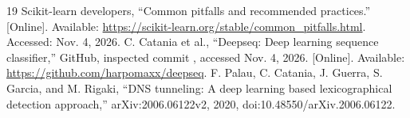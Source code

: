 \begin{thebibliography}{19}
 Scikit-learn developers, ``Common pitfalls and recommended practices.'' [Online]. Available: \url{https://scikit-learn.org/stable/common_pitfalls.html}. Accessed: Nov. 4, 2026.
 C. Catania et al., ``Deepseq: Deep learning sequence classifier,'' GitHub, inspected commit , accessed Nov. 4, 2026. [Online]. Available: \url{https://github.com/harpomaxx/deepseq}.
 F. Palau, C. Catania, J. Guerra, S. Garcia, and M. Rigaki, ``DNS tunneling: A deep learning based lexicographical detection approach,'' arXiv:2006.06122v2, 2020, doi:10.48550/arXiv.2006.06122.
\end{thebibliography}
